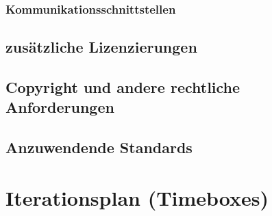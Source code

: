 \documentclass[a4paper,12pt,twoside]{scrreprt}
\begin{document}
    \subsection{Kommunikationsschnittstellen}
        
    \section{zusätzliche Lizenzierungen}
        
    \section{Copyright und andere rechtliche Anforderungen}
        
    \section{Anzuwendende Standards}
        

    \chapter{Iterationsplan (Timeboxes)}
\end{document}
